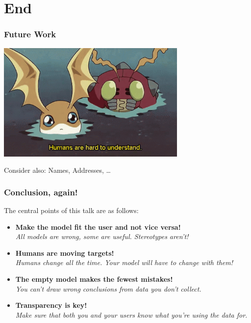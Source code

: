 \documentclass[aspectratio=169,x11names]{beamer}
\begin{document}
\section{End}

\begin{frame}
\frametitle{Future Work}

\begin{center}
\includegraphics[width=0.7\textwidth,keepaspectratio]{images/humans.png} 
\large\medskip

Consider also: Names, Addresses, \dots
\end{center}
\end{frame}

\begin{frame}
\frametitle{Conclusion, again!}
\large
The central points of this talk are as follows:\bigskip

\begin{itemize}
\item \textbf{Make the model fit the user and not vice versa!}\\
\emph{All models are wrong, some are useful. Stereotypes aren't!}\medskip
\item \textbf{Humans are moving targets!}\\
\emph{Humans change all the time. Your model will have to change with them!}\medskip
\item \textbf{The empty model makes the fewest mistakes!}\\
\emph{You can't draw wrong conclusions from data you don't collect.}\medskip
\item \textbf{Transparency is key!}\\
\emph{Make sure that both you and your users know what you're using the data for.}
\end{itemize}

\end{frame}
\end{document}

